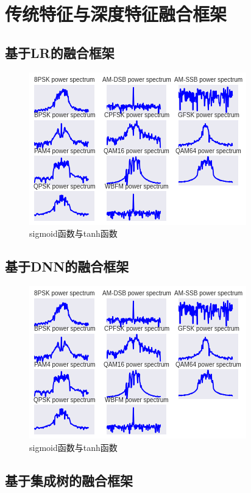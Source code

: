 \section{传统特征与深度特征融合框架}

\subsection{基于LR的融合框架}

\begin{figure}[!h]
	\centering
	\includegraphics[scale=0.9]{figures/chapter_3/signal_view_2}
	\caption{sigmoid函数与tanh函数}\label{fig_2_2}
\end{figure}

\subsection{基于DNN的融合框架}

\begin{figure}[!h]
	\centering
	\includegraphics[scale=0.9]{figures/chapter_3/signal_view_2}
	\caption{sigmoid函数与tanh函数}\label{fig_2_2}
\end{figure}

\subsection{基于集成树的融合框架}


